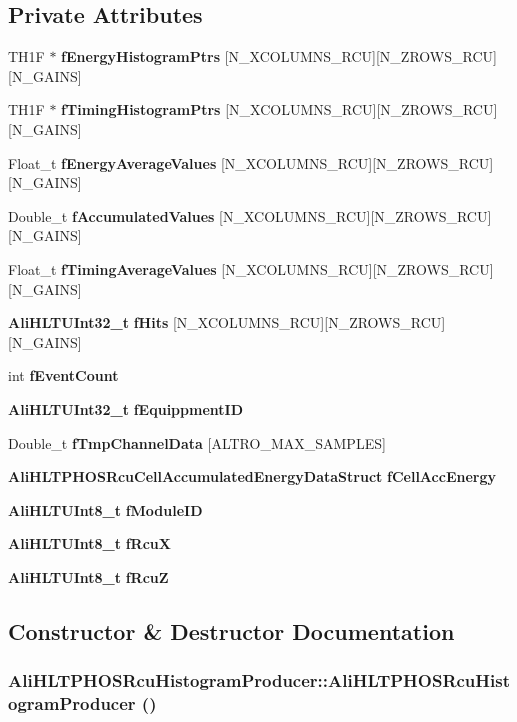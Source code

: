 \subsection*{Private Attributes}
\begin{CompactItemize}
\item 
TH1F $\ast$ {\bf f\-Energy\-Histogram\-Ptrs} [N\_\-XCOLUMNS\_\-RCU][N\_\-ZROWS\_\-RCU][N\_\-GAINS]
\item 
TH1F $\ast$ {\bf f\-Timing\-Histogram\-Ptrs} [N\_\-XCOLUMNS\_\-RCU][N\_\-ZROWS\_\-RCU][N\_\-GAINS]
\item 
Float\_\-t {\bf f\-Energy\-Average\-Values} [N\_\-XCOLUMNS\_\-RCU][N\_\-ZROWS\_\-RCU][N\_\-GAINS]
\item 
Double\_\-t {\bf f\-Accumulated\-Values} [N\_\-XCOLUMNS\_\-RCU][N\_\-ZROWS\_\-RCU][N\_\-GAINS]
\item 
Float\_\-t {\bf f\-Timing\-Average\-Values} [N\_\-XCOLUMNS\_\-RCU][N\_\-ZROWS\_\-RCU][N\_\-GAINS]
\item 
{\bf Ali\-HLTUInt32\_\-t} {\bf f\-Hits} [N\_\-XCOLUMNS\_\-RCU][N\_\-ZROWS\_\-RCU][N\_\-GAINS]
\item 
int {\bf f\-Event\-Count}
\item 
{\bf Ali\-HLTUInt32\_\-t} {\bf f\-Equippment\-ID}
\item 
Double\_\-t {\bf f\-Tmp\-Channel\-Data} [ALTRO\_\-MAX\_\-SAMPLES]
\item 
{\bf Ali\-HLTPHOSRcu\-Cell\-Accumulated\-Energy\-Data\-Struct} {\bf f\-Cell\-Acc\-Energy}
\item 
{\bf Ali\-HLTUInt8\_\-t} {\bf f\-Module\-ID}
\item 
{\bf Ali\-HLTUInt8\_\-t} {\bf f\-Rcu\-X}
\item 
{\bf Ali\-HLTUInt8\_\-t} {\bf f\-Rcu\-Z}
\end{CompactItemize}


\subsection{Constructor \& Destructor Documentation}
\subsubsection{\setlength{\rightskip}{0pt plus 5cm}Ali\-HLTPHOSRcu\-Histogram\-Producer::Ali\-HLTPHOSRcu\-Histogram\-Producer ()}\label{classAliHLTPHOSRcuHistogramProducer_a0}




